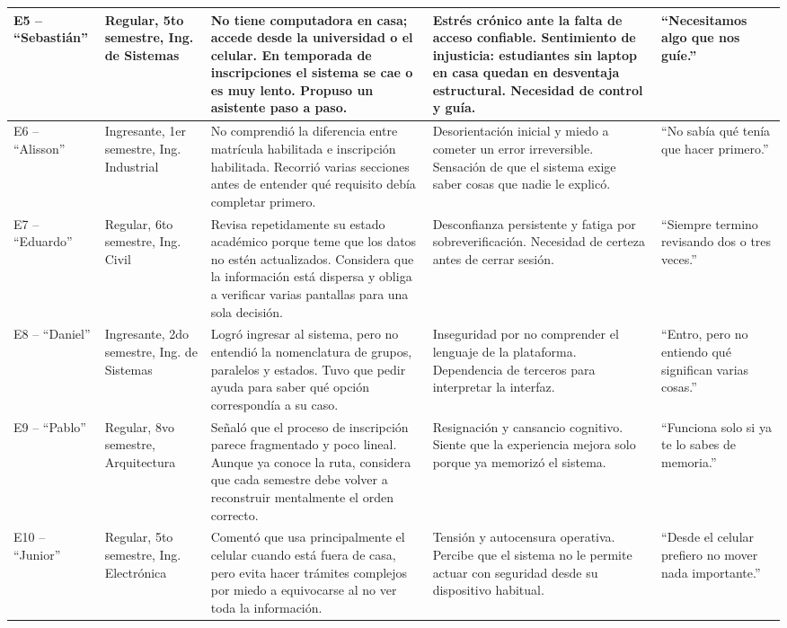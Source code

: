 \begin{longtable}{|p{1.8cm}|p{2.5cm}|p{3.2cm}|p{3.2cm}|p{2.4cm}|}
\hline
E5 -- ``Sebastián'' & Regular, 5to semestre, Ing. de Sistemas & No tiene computadora en casa; accede desde la universidad o el celular. En temporada de inscripciones el sistema se cae o es muy lento. Propuso un asistente paso a paso. & Estrés crónico ante la falta de acceso confiable. Sentimiento de injusticia: estudiantes sin laptop en casa quedan en desventaja estructural. Necesidad de control y guía. & ``Necesitamos algo que nos guíe.'' \\
\hline
E6 -- ``Alisson'' & Ingresante, 1er semestre, Ing. Industrial & No comprendió la diferencia entre matrícula habilitada e inscripción habilitada. Recorrió varias secciones antes de entender qué requisito debía completar primero. & Desorientación inicial y miedo a cometer un error irreversible. Sensación de que el sistema exige saber cosas que nadie le explicó. & ``No sabía qué tenía que hacer primero.'' \\
\hline
E7 -- ``Eduardo'' & Regular, 6to semestre, Ing. Civil & Revisa repetidamente su estado académico porque teme que los datos no estén actualizados. Considera que la información está dispersa y obliga a verificar varias pantallas para una sola decisión. & Desconfianza persistente y fatiga por sobreverificación. Necesidad de certeza antes de cerrar sesión. & ``Siempre termino revisando dos o tres veces.'' \\
\hline
E8 -- ``Daniel'' & Ingresante, 2do semestre, Ing. de Sistemas & Logró ingresar al sistema, pero no entendió la nomenclatura de grupos, paralelos y estados. Tuvo que pedir ayuda para saber qué opción correspondía a su caso. & Inseguridad por no comprender el lenguaje de la plataforma. Dependencia de terceros para interpretar la interfaz. & ``Entro, pero no entiendo qué significan varias cosas.'' \\
\hline
E9 -- ``Pablo'' & Regular, 8vo semestre, Arquitectura & Señaló que el proceso de inscripción parece fragmentado y poco lineal. Aunque ya conoce la ruta, considera que cada semestre debe volver a reconstruir mentalmente el orden correcto. & Resignación y cansancio cognitivo. Siente que la experiencia mejora solo porque ya memorizó el sistema. & ``Funciona solo si ya te lo sabes de memoria.'' \\
\hline
E10 -- ``Junior'' & Regular, 5to semestre, Ing. Electrónica & Comentó que usa principalmente el celular cuando está fuera de casa, pero evita hacer trámites complejos por miedo a equivocarse al no ver toda la información. & Tensión y autocensura operativa. Percibe que el sistema no le permite actuar con seguridad desde su dispositivo habitual. & ``Desde el celular prefiero no mover nada importante.'' \\

\end{longtable}
